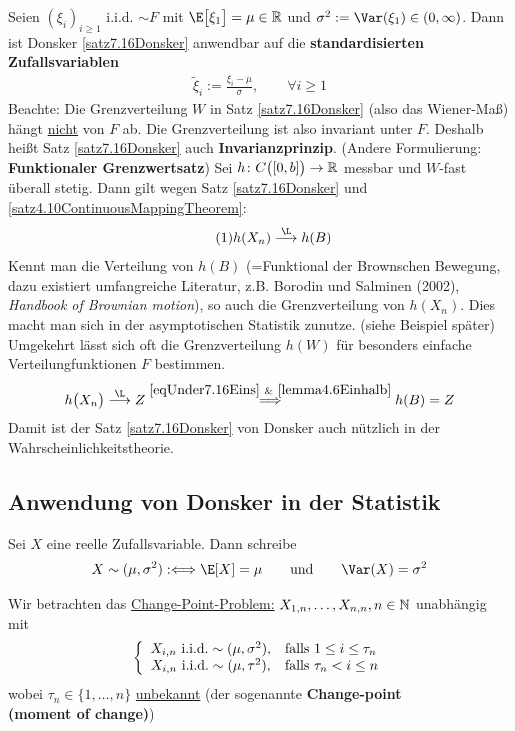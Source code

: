 Seien $(\xi_i)_{i\geq1}$ i.i.d. $\sim F$ mit $\E\big[\xi_1\big]=\mu\in\R$ und $\sigma^2:=\Var(\xi_1)\in(0,\infty)$. 
Dann ist Donsker \ref{satz7.16Donsker} anwendbar auf die \textbf{standardisierten Zufallsvariablen}
\begin{align*}
	\tilde{\xi}_i:=\frac{\xi_i-\mu}{\sigma},\qquad\forall i\geq1
\end{align*}
Beachte: Die Grenzverteilung $W$ in Satz \ref{satz7.16Donsker} (also das Wiener-Maß) hängt \ul{nicht} von $F$ ab. 
Die Grenzverteilung ist also invariant unter $F$. Deshalb heißt Satz \ref{satz7.16Donsker} auch \textbf{Invarianzprinzip}. 
(Andere Formulierung: \textbf{Funktionaler Grenzwertsatz})\nl
Sei $h\colon C\big([0,b]\big)\to\mathbb{R}$ messbar und $W$-fast überall stetig. 
Dann gilt wegen Satz \ref{satz7.16Donsker} und \ref{satz4.10ContinuousMappingTheorem}:
\begin{align}\label{eqUnder7.16Eins}\tag{1}
	h(X_n)\stackrel{\L}{\longrightarrow} h(B)
\end{align}
Kennt man die Verteilung von $h(B)$ (=Funktional der Brownschen Bewegung, dazu existiert umfangreiche Literatur, z.B. Borodin und Salminen (2002),
\textit{Handbook of Brownian motion}), so auch die Grenzverteilung von $h(X_n)$. Dies macht man sich in der asymptotischen Statistik zunutze.
(siehe Beispiel später) Umgekehrt lässt sich oft die Grenzverteilung $h(W)$ für besonders einfache Verteilungfunktionen $F$ bestimmen.
\begin{align*}
	h\big(X_n\big)\stackrel{\L}{\longrightarrow}Z
	\overset{\eqref{eqUnder7.16Eins}~\&~\ref{lemma4.6Einhalb}}{\implies}
	h(B)=Z
\end{align*}
Damit ist der Satz \ref{satz7.16Donsker} von Donsker auch nützlich in der Wahrscheinlichkeitstheorie.

\subsection{Anwendung von Donsker in der Statistik}
\begin{notation}
	Sei $X$ eine reelle Zufallsvariable. Dann schreibe
	\begin{align*}
		X\sim(\mu,\sigma^2):\Longleftrightarrow\E[X]=\mu\qquad\text{und}\qquad\Var(X)=\sigma^2
	\end{align*}
\end{notation}

Wir betrachten das \underline{Change-Point-Problem:}
$X_{1,n},\ldots,X_{n,n},n\in\mathbb{N}$ unabhängig mit 
\begin{align*}
	\left\lbrace\begin{array}{cl}
		X_{i,n}\text{ i.i.d.}\sim(\mu,\sigma^2), &\text{falls } 1\leq i\leq\tau_n\\
		X_{i,n}\text{ i.i.d.}\sim(\mu,\tau^2), &\text{falls } \tau_n< i\leq n
	\end{array}\right.
\end{align*}
wobei $\tau_n\in\lbrace1,\ldots,n\rbrace$ \ul{unbekannt} (der sogenannte \textbf{Change-point\\ (moment of change)}) 

